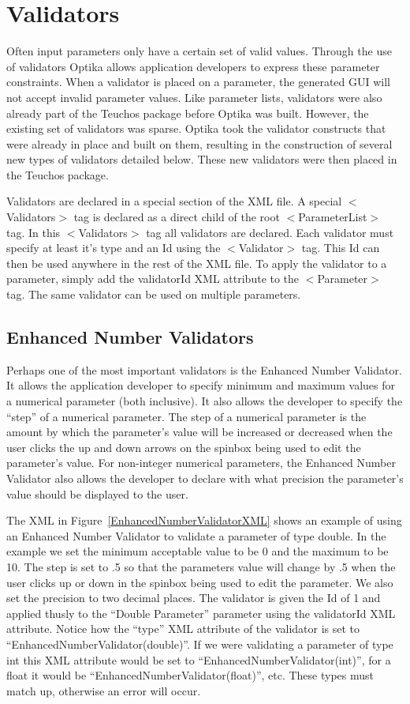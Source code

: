 \section{Validators}
Often input parameters only have a certain set of valid values. Through the use of validators Optika allows application
developers to express these parameter constraints. When a validator is placed on a parameter, the generated GUI will
not accept invalid parameter values. Like parameter lists, validators were also already part of the Teuchos package
before Optika was built. However, the existing set of validators was sparse. Optika took the validator constructs that
were already in place and built on them, resulting in the construction of several new types of validators detailed below.
These new validators were then placed in the Teuchos package.

Validators are declared in a special section of the XML file. A special $<$Validators$>$ tag is declared as a direct child
of the root $<$ParameterList$>$ tag. In this $<$Validators$>$ tag all validators are declared. Each validator must specify at
least it's type and an Id using the $<$Validator$>$ tag. This Id can then be used anywhere in the rest of the XML file. 
To apply the validator to a parameter, simply add the validatorId XML attribute to the $<$Parameter$>$ tag. The same validator 
can be used on multiple parameters.

\subsection{Enhanced Number Validators}
Perhaps one of the most important validators is the Enhanced Number Validator. It allows the application developer
to specify minimum and maximum values for a numerical parameter (both inclusive). It also allows the developer to specify the
``step'' of a numerical parameter. The step of a numerical parameter is the amount by which the parameter's value
will be increased or decreased when the user clicks the up and down arrows on the spinbox being used to edit
the parameter's value. For non-integer numerical parameters, the Enhanced Number Validator also allows the
developer to declare with what precision the parameter's value should be displayed to the user.

The XML in Figure~\ref{EnhancedNumberValidatorXML} shows an example of using an Enhanced Number Validator
to validate a parameter of type double. In the example we set the minimum acceptable value to be 0 and the 
maximum to be 10. The step is set to .5 so that the parameters value will change by .5 when the user clicks
up or down in the spinbox being used to edit the parameter. We also set the precision to two decimal places.
The validator is given the Id of 1 and applied thusly to the ``Double Parameter'' parameter using the validatorId
XML attribute. Notice how the ``type'' XML attribute of the validator is set to ``EnhancedNumberValidator(double)''. If we 
were validating a parameter of type int this XML attribute would be set to ``EnhancedNumberValidator(int)'', 
for a float it would be ``EnhancedNumberValidator(float)'', etc. These types must match up, otherwise an error will
occur.

